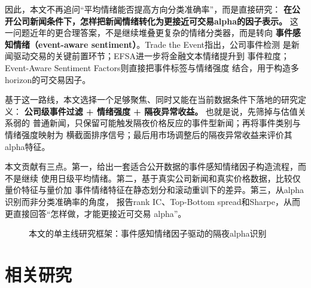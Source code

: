 \documentclass[UTF8,a4paper,10pt,twocolumn,fontset=none]{ctexart}
\begin{document}
因此，本文不再追问“平均情绪能否提高方向分类准确率”，而是直接研究：
\textbf{在公开公司新闻条件下，怎样把新闻情绪转化为更接近可交易alpha的因子表示。}
这一问题近年的更合理答案，不是继续堆叠更复杂的情绪分类器，而是转向
\textbf{事件感知情绪（event-aware sentiment）}。Trade the Event指出，公司事件检测
是新闻驱动交易的关键前置环节\cite{tradetheevent}；EFSA进一步将金融文本情绪提升到
事件粒度\cite{efsa}；Event-Aware Sentiment Factors则直接把事件标签与情绪强度
结合，用于构造多horizon的可交易因子\cite{eventawarefactor}。

基于这一路线，本文选择一个足够聚焦、同时又能在当前数据条件下落地的研究定义：
\textbf{公司级事件过滤 + 情绪强度 + 隔夜异常收益。} 也就是说，先筛掉与估值关系弱的
普通新闻，只保留可能触发隔夜价格反应的事件型新闻；再将事件类别与情绪强度映射为
横截面排序信号；最后用市场调整后的隔夜异常收益来评价其alpha特征。

本文贡献有三点。第一，给出一套适合公开数据的事件感知情绪因子构造流程，而不是继续
使用日级平均情绪。第二，基于真实公司新闻和真实价格数据，比较仅量价特征与量价加
事件情绪特征在静态划分和滚动重训下的差异。第三，从alpha识别而非分类准确率的角度，
报告rank IC、Top-Bottom spread和Sharpe，从而更直接回答“怎样做，才能更接近可交易
alpha”。

\begin{figure}[!htbp]
\centering
{}
\caption{本文的单主线研究框架：事件感知情绪因子驱动的隔夜alpha识别}
\label{fig:framework}
\end{figure}

\section{相关研究}
\end{document}
